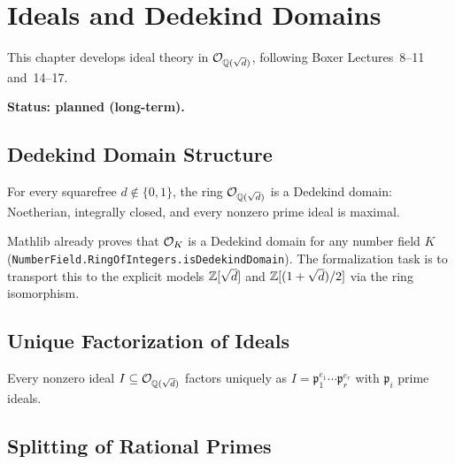 \chapter{Ideals and Dedekind Domains}\label{ch:ideals}

This chapter develops ideal theory in $\mathcal{O}_{\mathbb{Q}(\sqrt{d})}$,
following Boxer Lectures~8--11 and~14--17.

\textbf{Status: planned (long-term).}

\section{Dedekind Domain Structure}

\begin{theorem}
  \label{thm:plan_dedekind}
  \notready
  For every squarefree $d\notin\{0,1\}$, the ring $\mathcal{O}_{\mathbb{Q}(\sqrt{d})}$ is a
  Dedekind domain: Noetherian, integrally closed, and every
  nonzero prime ideal is maximal.
\end{theorem}

\begin{remark}
  Mathlib already proves that $\mathcal{O}_K$ is a Dedekind domain for any
  number field $K$ (\texttt{NumberField.RingOfIntegers.isDedekindDomain}).
  The formalization task is to transport this to the explicit
  models $\mathbb{Z}[\sqrt{d}]$ and $\mathbb{Z}[(1+\sqrt{d})/2]$ via the ring
  isomorphism.
\end{remark}

\section{Unique Factorization of Ideals}

\begin{theorem}
  \label{thm:plan_ideal_factorization}
  \notready
  Every nonzero ideal $I\subseteq\mathcal{O}_{\mathbb{Q}(\sqrt{d})}$ factors uniquely as
  $I = \mathfrak{p}_1^{e_1}\cdots\mathfrak{p}_r^{e_r}$
  with $\mathfrak{p}_i$ prime ideals.
\end{theorem}

\section{Splitting of Rational Primes}

